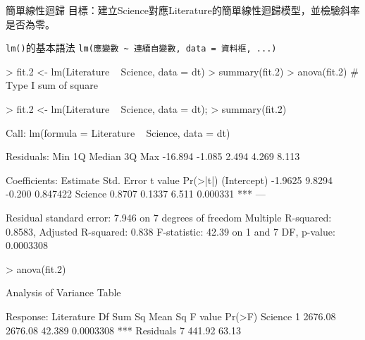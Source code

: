 \documentclass[14pt, aspectratio=43]{beamer}
\begin{document}
%


\begin{frame}{簡單線性迴歸}
目標：建立Science對應Literature的簡單線性迴歸模型，並檢驗斜率是否為零。
\begin{block}{\texttt{lm()}的基本語法}
\verb+lm(應變數 ~ 連續自變數, data = 資料框, ...)+
\end{block}
\begin{RC}
> fit.2 <- lm(Literature ~ Science, data = dt)
> summary(fit.2)
> anova(fit.2) # Type I sum of square
\end{RC}

\framebreak

\begin{RC}
> fit.2 <- lm(Literature ~ Science, data = dt); 
> summary(fit.2)
\end{RC}
\begin{R}
Call:
lm(formula = Literature ~ Science, data = dt)

Residuals:
    Min      1Q  Median      3Q     Max 
-16.894  -1.085   2.494   4.269   8.113 

Coefficients:
            Estimate Std. Error t value Pr(>|t|)    
(Intercept)  -1.9625     9.8294  -0.200 0.847422    
Science       0.8707     0.1337   6.511 0.000331 ***
---

Residual standard error: 7.946 on 7 degrees of freedom
Multiple R-squared:  0.8583,	Adjusted R-squared:  0.838 
F-statistic: 42.39 on 1 and 7 DF,  p-value: 0.0003308
\end{R}

\framebreak

\begin{RC}
> anova(fit.2)
\end{RC}
\begin{R}
Analysis of Variance Table

Response: Literature
          Df  Sum Sq Mean Sq F value    Pr(>F)    
Science    1 2676.08 2676.08  42.389 0.0003308 ***
Residuals  7  441.92   63.13                      
\end{R}
\end{frame}
\end{document}
